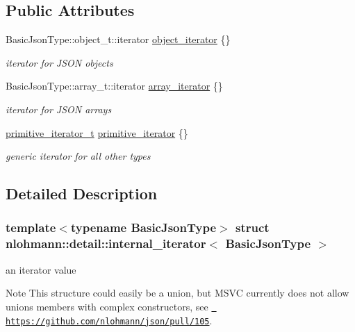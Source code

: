 \subsection*{Public Attributes}
\begin{DoxyCompactItemize}
\item 
Basic\+Json\+Type\+::object\+\_\+t\+::iterator \mbox{\hyperlink{structnlohmann_1_1detail_1_1internal__iterator_a8cb0af3498061426c1d0a65ad6220408}{object\+\_\+iterator}} \{\}
\begin{DoxyCompactList}\small\item\em iterator for J\+S\+ON objects \end{DoxyCompactList}\item 
Basic\+Json\+Type\+::array\+\_\+t\+::iterator \mbox{\hyperlink{structnlohmann_1_1detail_1_1internal__iterator_a8294a6e6f01b58e1cce8fbae66a50b5d}{array\+\_\+iterator}} \{\}
\begin{DoxyCompactList}\small\item\em iterator for J\+S\+ON arrays \end{DoxyCompactList}\item 
\mbox{\hyperlink{classnlohmann_1_1detail_1_1primitive__iterator__t}{primitive\+\_\+iterator\+\_\+t}} \mbox{\hyperlink{structnlohmann_1_1detail_1_1internal__iterator_a2b3bb45f968210e42c282017eeeb63a8}{primitive\+\_\+iterator}} \{\}
\begin{DoxyCompactList}\small\item\em generic iterator for all other types \end{DoxyCompactList}\end{DoxyCompactItemize}


\subsection{Detailed Description}
\subsubsection*{template$<$typename Basic\+Json\+Type$>$\newline
struct nlohmann\+::detail\+::internal\+\_\+iterator$<$ Basic\+Json\+Type $>$}

an iterator value 

\begin{DoxyNote}{Note}
This structure could easily be a union, but M\+S\+VC currently does not allow unions members with complex constructors, see \href{https://github.com/nlohmann/json/pull/105}{\texttt{ https\+://github.\+com/nlohmann/json/pull/105}}. 
\end{DoxyNote}


